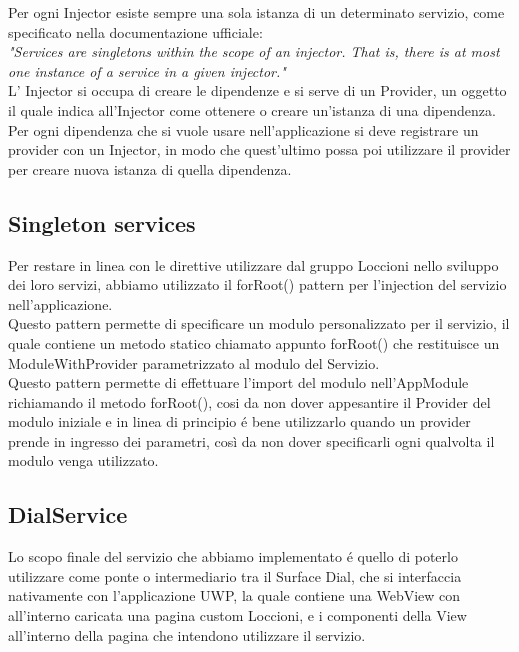Per ogni Injector esiste sempre una sola istanza di un determinato servizio, come specificato nella documentazione ufficiale:\\

\emph{"Services are singletons within the scope of an injector. That is, there is at most one instance of a service in a given injector."}\\

L’ Injector si occupa di creare le dipendenze e si serve di un Provider, un oggetto il quale indica all'Injector come ottenere o creare un'istanza di una dipendenza.
Per ogni dipendenza che si vuole usare nell'applicazione si deve registrare un provider con un Injector, in modo che quest'ultimo possa poi utilizzare il provider per creare nuova istanza di quella dipendenza.

\subsection{Singleton services}

Per restare in linea con le direttive utilizzare dal gruppo Loccioni nello sviluppo dei loro servizi, abbiamo utilizzato il forRoot() pattern per l’injection del servizio nell’applicazione.\\

Questo pattern permette di specificare un modulo personalizzato per il servizio, il quale contiene un metodo statico chiamato appunto forRoot() che restituisce un ModuleWithProvider parametrizzato al modulo del Servizio.\\

Questo pattern permette di effettuare l’import del modulo nell’AppModule richiamando il metodo forRoot(), cosi da non dover appesantire il Provider del modulo iniziale e in linea di principio é bene utilizzarlo quando un provider prende in ingresso dei parametri, così da non dover specificarli ogni qualvolta il modulo venga utilizzato.

\subsection{DialService}

Lo scopo finale del servizio che abbiamo implementato é quello di poterlo utilizzare come ponte o intermediario tra il Surface Dial, che si interfaccia nativamente con l'applicazione UWP, la quale contiene una WebView con all'interno caricata una pagina custom Loccioni, e i componenti della View all'interno della pagina che intendono utilizzare il servizio.\\

